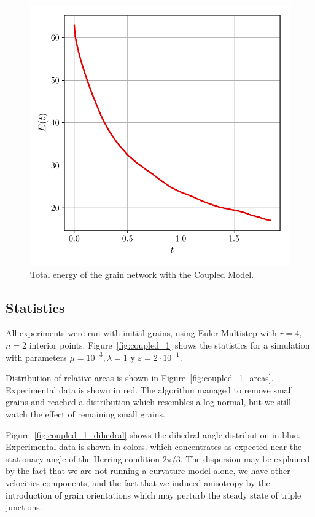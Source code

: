 \begin{figure}[t]
    \centering
    \includegraphics[scale=0.5]{figures/coupled/coupled_model_energy.pdf}
    \caption{Total energy of the grain network with the Coupled Model.}
    \label{fig:coupled_energy}
\end{figure}


\subsection{Statistics}
All experiments were run with initial  grains, using Euler Multistep with $r=4$, $n=2$ interior points. Figure~\ref{fig:coupled_1} shows the statistics for a simulation with parameters $\mu = 10^{-3}, \lambda=1$ y $\varepsilon=2\cdot10^{-1}$. 

Distribution of relative areas is shown in Figure~\ref{fig:coupled_1_areas}. Experimental data is shown in red. The algorithm managed to remove small grains and reached a distribution which resembles a log-normal, but we still watch the effect of remaining small grains.

Figure~\ref{fig:coupled_1_dihedral} shows the dihedral angle distribution in blue. Experimental data is shown in colors. which concentrates as expected near the stationary angle of the Herring condition $2\pi/3$. The dispersion may be explained by the fact that we are not running a curvature model alone, \ie we have other velocities components, and the fact that we induced anisotropy by the introduction of grain orientations which may perturb the steady state of triple junctions.

